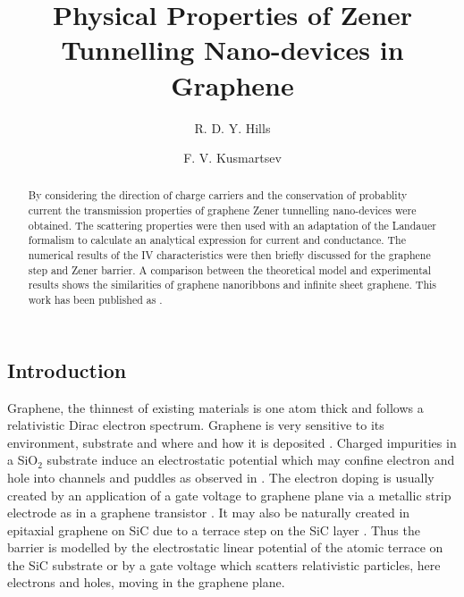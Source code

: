 \documentclass[prl,twocolumn,aps,superscriptaddress,floatfix,10pt]{revtex4}
\begin{document}
\title{Physical Properties of Zener Tunnelling Nano-devices in Graphene}

\author{R. D. Y. Hills}

\author{F. V. Kusmartsev}

\begin{abstract}
By considering the direction of charge carriers and the conservation of probablity current the transmission properties of graphene Zener tunnelling nano-devices were obtained. The scattering properties were then used with an adaptation of the Landauer formalism to calculate an analytical expression for current and conductance. The numerical results of the IV characteristics were then briefly discussed for the graphene step and Zener barrier. A comparison between the theoretical model and experimental results shows the similarities of graphene nanoribbons and infinite sheet graphene. This work has been published as \cite{r0}.
\end{abstract}

\maketitle

\pagestyle{plain}


\subsection{Introduction}

	Graphene, the thinnest of existing materials is one atom thick and follows a relativistic Dirac electron spectrum. Graphene is very sensitive to its environment, substrate and where and how it is deposited \cite{OHare12}. Charged impurities in a SiO$_2$ substrate induce an electrostatic potential which may confine electron and hole into channels  and puddles as observed in \cite{Martin08a,Martin09b}. The electron doping is usually created by an application of a gate voltage to graphene plane via a metallic strip electrode as in a graphene transistor \cite{Lin11}. It may also be naturally created in epitaxial graphene on SiC due to a terrace step on the SiC layer \cite{Sutter09,Robinson10}. Thus the barrier is modelled by the electrostatic linear potential of the atomic terrace on the SiC substrate or by a gate voltage which scatters relativistic particles, here electrons and holes, moving in the graphene plane.
\end{document}
